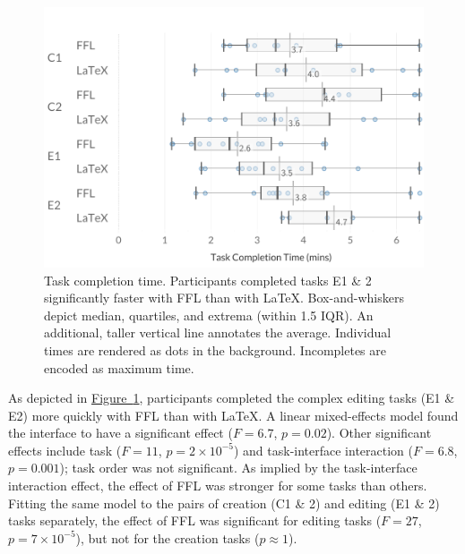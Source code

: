 \begin{figure}
    \centering
    \includegraphics[width=\linewidth]{figures/Timing.pdf}
    \caption{Task completion time. Participants completed tasks E1 \& 2 significantly faster with FFL than with LaTeX. \normalfont Box-and-whiskers depict median, quartiles, and extrema (within 1.5 IQR). An additional, taller vertical line annotates the average. Individual times are rendered as dots in the background. Incompletes are encoded as maximum time. }
    \label{fig:timing}
\end{figure}

As depicted in \hyperref[fig:timing]{Figure~\ref{fig:timing}}, participants completed the complex editing tasks (E1 \& E2) more quickly with FFL than with LaTeX. A linear mixed-effects model found the interface to have a significant effect ($F=6.7$, $p=0.02$). Other significant effects include task ($F=11$, $p=2\times10^{-5}$) and task-interface interaction ($F=6.8$, $p=0.001$); task order was not significant. As implied by the task-interface interaction effect, the effect of FFL was stronger for some tasks than others. Fitting the same model to the pairs of creation (C1 \& 2) and editing (E1 \& 2) tasks separately, the effect of FFL was significant for editing tasks ($F = 27$, $p=7\times10^{-5}$), but not for the creation tasks ($p\approx1$). 

